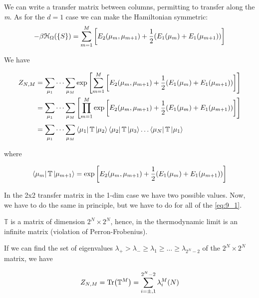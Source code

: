 \documentclass[../main/main.tex]{subfiles}
\begin{document}
We can write a transfer matrix between columns, permitting to transfer along the \emph{m}. As for the \( d=1 \) case we can make the Hamiltonian symmetric:
\begin{equation}
  -\beta \mathcal{H}_ \Omega  ( \{ S \}  ) = \sum_{m=1}^{M} \qty[E_2(\mu _m, \mu _{m+1}) + \frac{1}{2}(E_1(\mu _m) + E_1(\mu _{m+1}))]
\end{equation}

We have

\begin{equation}
\begin{split}
Z_{N,M}  &= \sum_{\mu_1}^{} \dots \sum_{\mu_M}^{} \exp \qty[ \sum_{m=1}^{M} \qty[E_2(\mu _m, \mu _{m+1}) + \frac{1}{2}(E_1(\mu _m) + E_1(\mu _{m+1}))]] \\
&= \sum_{\mu_1}^{} \dots \sum_{\mu_M}^{}  \qty[ \prod_{m=1}^{M} \exp  \qty[E_2(\mu _m, \mu _{m+1}) + \frac{1}{2}(E_1(\mu _m) + E_1(\mu _{m+1}))]] \\
& =  \sum_{\mu_1}^{} \dots \sum_{\mu_M}^{} \bra{\mu_1} \mathbb{T} \ket{\mu_2} \bra{\mu_2}  \mathbb{T} \ket{\mu_3} \dots \bra{\mu_N}  \mathbb{T} \ket{\mu_1}
\end{split}
\end{equation}

where

\begin{equation}
  \bra{\mu _m} \mathbb{T} \ket{\mu _{m+1}} = \exp \qty[E_2(\mu _m, \mu _{m+1}) + \frac{1}{2}(E_1(\mu _m) + E_1(\mu _{m+1}))]
  \label{eq:9_2}
\end{equation}


\begin{remark}
In the 2x2 transfer matrix in the 1-dim case we have two possible values. Now, we have to do the same in principle, but we have to do for all of the \eqref{eq:9_1}.
\end{remark}
\begin{remark}
\( \mathbb{T} \) is a matrix of dimension \( 2^N \times 2^N \), hence, in the thermodynamic limit is an infinite matrix (violation of Perron-Frobenius).
\end{remark}




 If we can find the set of eigenvalues \( \lambda _+ > \lambda _- \ge \lambda _1 \ge \dots \ge \lambda _{2^N-2} \) of the  \( 2^N \times 2^N \) matrix, we have

\begin{equation}
      Z_{N,M}  = \Tr(\mathbb{T}^M) = \sum_{i= \pm, 1}^{ 2^N-2} \lambda _i^{M}(N)
\end{equation}
\end{document}

